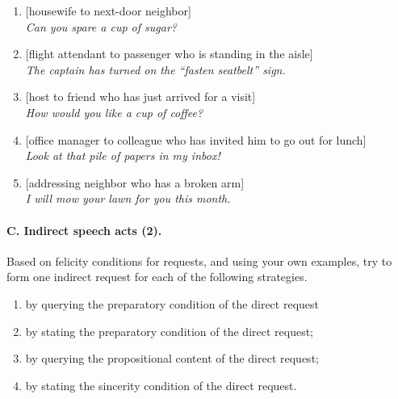 {\begin{enumerate}

\item  {[housewife to next-door neighbor]}\\
\textit{Can you spare a cup of sugar?}
\item {[flight attendant to passenger who is standing in the aisle]}\\
\textit{The captain has turned on the “fasten seatbelt” sign.}
\item  {[host to friend who has just arrived for a visit]}\\
\textit{How would you like a cup of coffee?}
\item  {[office manager to colleague who has invited him to go out for lunch]}\\ 
\textit{Look at that pile of papers in my inbox!}
\item  {[addressing neighbor who has a broken arm]}\\
\textit{I will mow your lawn for you this month.}
\end{enumerate}

\newpage 
\paragraph*{C. Indirect speech acts (2).}

Based on felicity conditions for requests, and using your own examples, try to form one indirect request for each of the following strategies.

\begin{enumerate}
\item  by querying the preparatory condition of the direct request\\

\item  by stating the preparatory condition of the direct request;
\item  by querying the propositional content of the direct request;
\item  by stating the sincerity condition of the direct request.
\end{enumerate}
}
